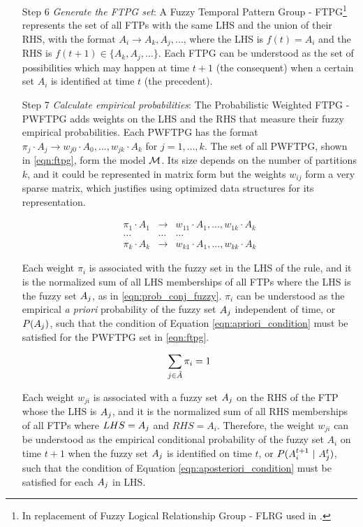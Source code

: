 \begin{enumerate}
\item[Step 6] \textit{Generate the FTPG set}: A Fuzzy Temporal Pattern Group - FTPG\footnote{In replacement of Fuzzy Logical Relationship Group - FLRG used in \cite{Chen2006}.} represents the set of all FTPs with the same LHS and the union of their RHS, with the format $A_i \rightarrow A_k, A_j,...$, where the LHS is $f(t) = A_i$ and the RHS is $f(t+1) \in \{A_k, A_j,...\}$. Each FTPG can be understood as the set of possibilities which may happen at time $t+1$ (the consequent) when a certain set $A_i$ is identified at time $t$ (the precedent).

\item[Step 7] \textit{Calculate empirical probabilities}: The Probabilistic Weighted FTPG - PWFTPG adds weights on the LHS and the RHS that measure their fuzzy empirical probabilities. Each PWFTPG has the format $\pi_j \cdot A_j \rightarrow  w_{j0} \cdot A_0, ..., w_{jk} \cdot A_k$ for $j = 1,\ldots, k$. The set of all  PWFTPG, shown in \eqref{eqn:ftpg}, form the model $\mathcal{M}$. Its size depends on the number of partitions $k$, and it could be represented in matrix form but the weights $w_{ij}$ form a very sparse matrix, which justifies using optimized data structures for its representation.

\begin{equation}
\begin{array}{rcl}
\pi_1 \cdot A_1 & \rightarrow &  w_{11} \cdot A_1, ..., w_{1k} \cdot A_k \\
\ldots & \ldots & \ldots \\
\pi_k \cdot A_k & \rightarrow &  w_{k1} \cdot A_1, ..., w_{kk} \cdot A_k
\end{array}
\label{eqn:ftpg}
\end{equation}

Each weight $\pi_i$ is associated with the fuzzy set in the LHS of the rule, and it is the normalized sum of all LHS memberships of all FTPs where the LHS is the fuzzy set $A_j$, as in \ref{eqn:prob_conj_fuzzy}. $\pi_i$ can be understood as the empirical \textit{a priori} probability of the fuzzy set $A_j$ independent of time, or $P(A_j)$, such that the condition of Equation \ref{eqn:apriori_condition} must be satisfied for the PWFTPG set in \ref{eqn:ftpg}.

\begin{equation}
    \sum_{j \in \tilde{A}} \pi_i = 1
    \label{eqn:apriori_condition}
\end{equation}

Each weight $w_{ji}$ is associated with a fuzzy set $A_j$ on the RHS of the FTP whose the LHS is $A_j$, and it is the normalized sum of all RHS memberships of all FTPs where $LHS = A_j$ and $RHS = A_i$. Therefore, the weight $w_{ji}$ can be understood as the empirical conditional probability of the fuzzy set $A_i$ on time $t+1$ when the fuzzy set $A_j$ is identified on time $t$, or $P(A_i^{t+1}\ |\ A_j^t)$, such that the condition of Equation \ref{eqn:aposteriori_condition} must be satisfied for each $A_j$ in LHS.


\end{enumerate}
